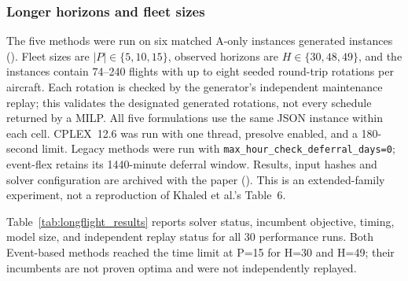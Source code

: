 \subsubsection{Longer horizons and fleet sizes}

The five methods were run on six matched A-only instances generated instances (). Fleet sizes are
$|P|\in\{5,10,15\}$, observed horizons are $H\in\{30,48,49\}$, and the
instances contain 74--240 flights with up to eight seeded round-trip
rotations per aircraft. Each rotation is checked by the generator's
independent maintenance replay; this validates the designated generated
rotations, not every schedule returned by a MILP. All five formulations use
the same JSON instance within each cell. CPLEX~12.6 was run with one thread,
presolve enabled, and a 180-second limit. Legacy methods were run with
\texttt{max\_hour\_check\_deferral\_days=0}; event-flex retains its 1440-minute
deferral window. Results, input hashes and solver configuration are archived
with the paper (). This is an extended-family experiment, not a reproduction of
Khaled et al.'s Table~6.

Table~\ref{tab:longflight_results} reports solver status, incumbent objective,
timing, model size, and independent replay status for all 30 performance runs.
Both Event-based methods reached the time limit at P=15 for H=30 and H=49;
their incumbents are not proven optima and were not independently replayed.

